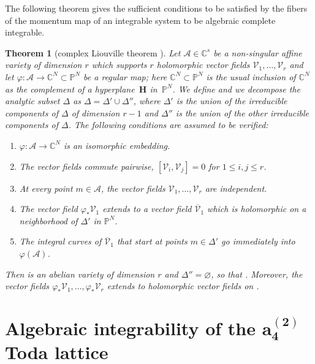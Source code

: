 \documentclass[10pt,a4paper]{amsart}
\numberwithin{equation}{section}
\newtheorem{Theorem}{Theorem}[section]
\begin{document}
The following theorem gives the sufficient conditions to be
satisfied by the fibers of the momentum map of an integrable system
to be algebraic complete integrable.
\begin{Theorem}[complex Liouville theorem {\cite{al_Moer3}}]\label{liouville}
Let $\mathcal{A} \in \mathbb{C}^s$ be a non-singular affine
variety of dimension $r$ which supports $r$ holomorphic vector
fields $\mathcal{V}_1,\dots,\mathcal{V}_r$ and let
$\varphi\colon \mathcal{A}\longrightarrow \mathbb{C}^N\subset
\mathbb{P}^N$ be a regular map; here $\mathbb{C}^N\subset
\mathbb{P}^N$ is the usual inclusion of $\mathbb{C}^N$ as the
complement of a hyperplane~$\mathbf{H}$ in~$\mathbb{P}^N$. We
define  and we decompose the analytic
subset $\Delta$ as $\Delta=\Delta'\cup \Delta''$, where
$\Delta'$ is the union of the irreducible components of $\Delta$
of dimension $r-1$ and $\Delta''$ is the union of the other
irreducible components of $\Delta$. The following conditions are
assumed to be verified:
\begin{enumerate}\itemsep=0pt
\item[$1.$] $\varphi\colon \mathcal{A}\longrightarrow \mathbb{C}^N$ is an isomorphic embedding.
 \item[$2.$] The vector fields commute pairwise,
$[\mathcal{V}_i,\mathcal{V}_j]=0$ for $1\leq i,j \leq r$.
 \item[$3.$] At every point $m\in \mathcal{A}$, the vector fields
$\mathcal{V}_1,\dots,\mathcal{V}_r$ are independent.
 \item[$4.$] The vector field $\varphi_{\ast}\mathcal{V}_1$
extends to a vector field $\overline{\mathcal{V}}_1$ which is
holomorphic on a neighborhood of $\Delta'$ in $\mathbb{P}^N$.
 \item[$5.$] The integral curves of $\overline{\mathcal{V}}_1$ that start at points $m\in \Delta'$ go immediately
into $\varphi (\mathcal{A} )$.
\end{enumerate}
Then  is an abelian
variety of dimension $r$ and $\Delta''=\varnothing$, so that
. Moreover, the vector fields $\varphi_{
\ast}\mathcal{V}_1,\dots,\varphi_{\ast}\mathcal{V}_r$ extends to
holomorphic vector fields on
.
\end{Theorem}


\section[Algebraic integrability of the a\_4\^{}(2) Toda lattice]{Algebraic integrability of the $\boldsymbol{a_4^{(2)}}$ Toda lattice}\label{sec3}
\end{document}
